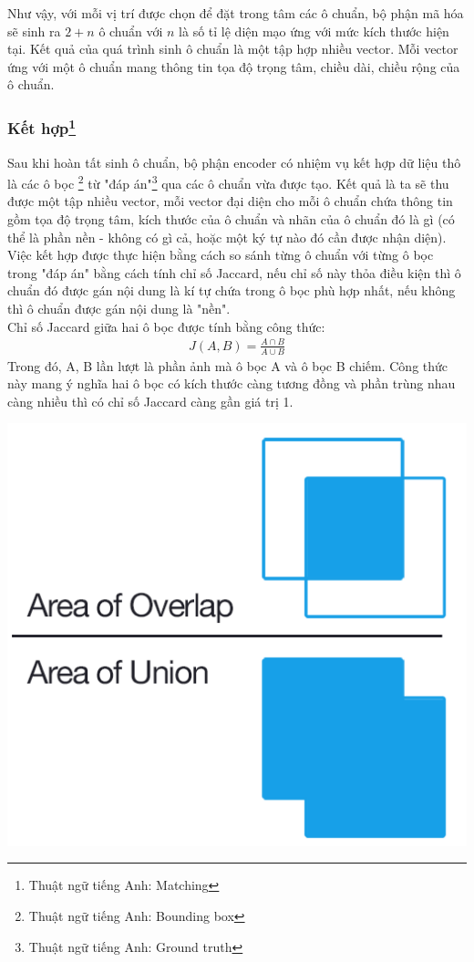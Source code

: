 \documentclass[a4paper,12pt]{article}
\begin{document}
	Như vậy, với mỗi vị trí được chọn để đặt trong tâm các ô chuẩn, bộ phận mã hóa sẽ sinh ra $2 + n$ ô chuẩn với $n$ là số tỉ lệ diện mạo ứng với mức kích thước hiện tại. Kết quả của quá trình sinh ô chuẩn là một tập hợp nhiều vector. Mỗi vector ứng với một ô chuẩn mang thông tin tọa độ trọng tâm, chiều dài, chiều rộng của ô chuẩn.
	
	\subsubsection*{Kết hợp\footnote{Thuật ngữ tiếng Anh: Matching}}
	
	Sau khi hoàn tất sinh ô chuẩn, bộ phận encoder có nhiệm vụ kết hợp dữ liệu thô là các ô bọc \footnote{Thuật ngữ tiếng Anh: Bounding box} từ "đáp án"\footnote{Thuật ngữ tiếng Anh: Ground truth} qua các ô chuẩn vừa được tạo. Kết quả là ta sẽ thu được một tập nhiều vector, mỗi vector đại diện cho mỗi ô chuẩn chứa thông tin gồm tọa độ trọng tâm, kích thước của ô chuẩn và nhãn của ô chuẩn đó là gì (có thể là phần nền - không có gì cả, hoặc một ký tự nào đó cần được nhận diện). \\
	
	Việc kết hợp được thực hiện bằng cách so sánh từng ô chuẩn với từng ô bọc trong "đáp án" bằng cách tính chỉ số Jaccard\cite{Jaccard}, nếu chỉ số này thỏa điều kiện thì ô chuẩn đó được gán nội dung là kí tự chứa trong ô bọc phù hợp nhất, nếu không thì ô chuẩn được gán nội dung là "nền".\\
	
	Chỉ số Jaccard\cite{Jaccard} giữa hai ô bọc được tính bằng công thức:
	\begin{align}
	J(A, B) = \frac{A \cap B }{ A \cup B }
	\end{align}
	Trong đó, A, B lần lượt là phần ảnh mà ô bọc A và ô bọc B chiếm. Công thức này mang ý nghĩa hai ô bọc có kích thước càng tương đồng và phần trùng nhau càng nhiều thì có chỉ số Jaccard\cite{Jaccard} càng gần giá trị 1.\\
	
	\begin{center}
		\centering
		\includegraphics[width=0.5\linewidth]{Intersection_over_Union_-_visual_equation.png}
		\vspace{0.5cm}
	\end{center}
	
\end{document}
